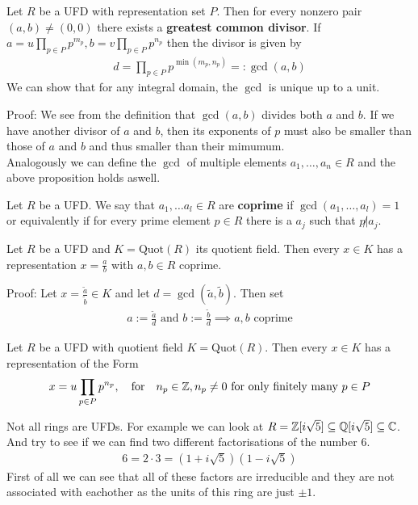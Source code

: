 \begin{proposition}[GCD]
	Let $R$ be a UFD with representation set $P$. Then for every nonzero pair $(a,b) \neq (0,0)$ there exists a \textbf{greatest common divisor}. If $a = u \prod_{p \in P}p^{m_p}, b = v \prod_{p \in P}p^{n_p}$ then the divisor is given by
	\begin{align*}
		d = \prod_{p \in P}p^{\min(m_p,n_p)} =: \gcd(a,b)
	\end{align*}
	We can show that for any integral domain, the $\gcd$ is unique up to a unit.
\end{proposition}
Proof: We see from the definition that $\gcd(a,b)$ divides both $a$ and $b$. If we have another divisor of $a$ and $b$, then its exponents of $p$ must also be smaller than those of $a$ and $b$ and thus smaller than their mimumum.\\

Analogously we can define the $\gcd$ of multiple elements $a_1, \ldots, a_n \in R$ and the above proposition holds aswell.

\begin{definition}[]
	Let $R$ be a UFD. We say that $a_1, \ldots a_l \in R$ are \textbf{coprime}  if $\gcd(a_1, \ldots, a_l) = 1$ or equivalently if for every prime element $p \in R$ there is a $a_j$ such that $p \not| a_j$.
\end{definition}

\begin{corollary}[]
	Let $R$ be a UFD and $K = \text{Quot}(R)$ its quotient field. Then every $x \in K$ has a representation $x = \frac{a}{b}$ with $a,b \in R$ coprime.
\end{corollary}

Proof: Let $x = \frac{\tilde{a}}{\tilde{b}} \in K$ and let $d = \gcd(\tilde{a},\tilde{b})$. Then set
\begin{align*}
	a := \frac{\tilde{a}}{d} \text{ and } b := \frac{\tilde{b}}{d} \implies a,b \text{ coprime}
\end{align*}


\begin{corollary}[]
	Let $R$ be a UFD with quotient field $K = \text{Quot}(R)$. Then every $x \in K$ has a representation of the Form
	\begin{align*}
		x = u \prod_{p \in P} p^{n_p}, \quad \text{for} \quad n_p \in \mathbb{Z}, n_p \neq 0 \text{ for only finitely many } p \in P
	\end{align*}
\end{corollary}


Not all rings are UFDs. For example we can look at $R = \mathbb{Z}[i \sqrt{5}] \subseteq \mathbb{Q}[i\sqrt{5}] \subseteq \mathbb{C}$. And try to see if we can find two different factorisations of the number $6$.
\begin{align*}
	6 = 2 \cdot 3 = (1 + i \sqrt{5})(1 - i \sqrt{5})
\end{align*}
First of all we can see that all of these factors are irreducible and they are not associated with eachother as the units of this ring are just $\pm 1$.\\


